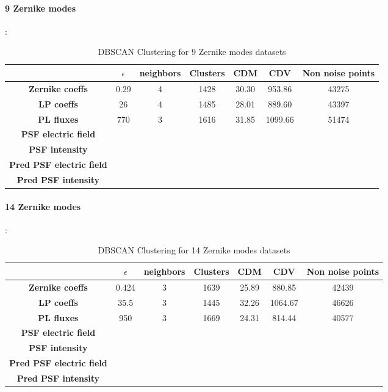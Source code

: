 		\paragraph{9 Zernike modes}:
		\begin{table}[h!]
			\centering
			\begin{tabular}{|c|c|c|c|c|c|c|}
				\hline
				\textbf{} & \textbf{$\epsilon$} & \textbf{neighbors} & \textbf{Clusters} & \textbf{CDM} & \textbf{CDV} & \textbf{Non noise points}\\
				\hline
				\textbf{Zernike coeffs} & 0.29 & 4 & 1428 & 30.30 & 953.86 & 43275 \\
				\hline
				\textbf{LP coeffs} & 26 & 4 & 1485 & 28.01 & 889.60 & 43397 \\
				\hline
				\textbf{PL fluxes} & 770 & 3 & 1616 & 31.85 & 1099.66 & 51474 \\
				\hline
				\textbf{PSF electric field} &  &  &  &  &  &  \\
				\hline
				\textbf{PSF intensity} &  &  &  &  &  &  \\
				\hline
				\textbf{Pred PSF electric field} &  &  &  &  &  &  \\
				\hline
				\textbf{Pred PSF intensity} &  &  &  &  &  &  \\
				\hline
			\end{tabular}
		\caption{DBSCAN Clustering for 9 Zernike modes datasets}
		\end{table}
		\FloatBarrier
		
		\paragraph{14 Zernike modes}:
		\begin{table}[h!]
			\centering
			\begin{tabular}{|c|c|c|c|c|c|c|}
				\hline
				\textbf{} & \textbf{$\epsilon$} & \textbf{neighbors} & \textbf{Clusters} & \textbf{CDM} & \textbf{CDV} & \textbf{Non noise points}\\
				\hline
				\textbf{Zernike coeffs} & 0.424 & 3 & 1639 & 25.89 & 880.85 & 42439 \\
				\hline
				\textbf{LP coeffs} & 35.5 & 3 & 1445 & 32.26 & 1064.67 & 46626 \\
				\hline
				\textbf{PL fluxes} & 950 & 3 & 1669 & 24.31 & 814.44 & 40577 \\
				\hline
				\textbf{PSF electric field} &  &  &  &  &  &  \\
				\hline
				\textbf{PSF intensity} &  &  &  &  &  &  \\
				\hline
				\textbf{Pred PSF electric field} &  &  &  &  &  &  \\
				\hline
				\textbf{Pred PSF intensity} &  &  &  &  &  &  \\
				\hline
			\end{tabular}
		\caption{DBSCAN Clustering for 14 Zernike modes datasets}
		\end{table}
		\FloatBarrier
		

